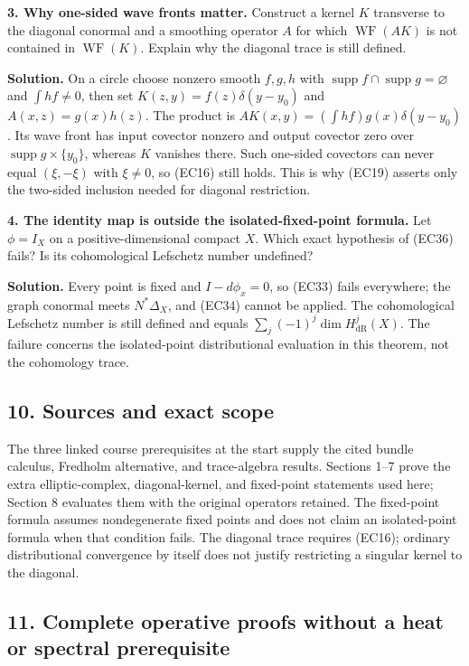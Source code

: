 \documentclass[
  11pt,
]{article}
\begin{document}
\textbf{3. Why one-sided wave fronts matter.} Construct a kernel \(K\)
transverse to the diagonal conormal and a smoothing operator \(A\) for
which \(\operatorname{WF}(AK)\) is not contained in
\(\operatorname{WF}(K)\). Explain why the diagonal trace is still
defined.

\textbf{Solution.} On a circle choose nonzero smooth \(f,g,h\) with
\(\operatorname{supp}f\cap\operatorname{supp}g=\varnothing\) and
\(\int hf\ne0\), then set \(K(z,y)=f(z)\delta(y-y_0)\) and
\(A(x,z)=g(x)h(z)\). The product is
\(AK(x,y)=(\int hf)g(x)\delta(y-y_0)\). Its wave front has input
covector nonzero and output covector zero over
\(\operatorname{supp}g\times\{y_0\}\), whereas \(K\) vanishes there.
Such one-sided covectors can never equal \((\xi,-\xi)\) with
\(\xi\ne0\), so (EC16) still holds. This is why (EC19) asserts only the
two-sided inclusion needed for diagonal restriction.

\textbf{4. The identity map is outside the isolated-fixed-point
formula.} Let \(\phi=I_X\) on a positive-dimensional compact \(X\).
Which exact hypothesis of (EC36) fails? Is its cohomological Lefschetz
number undefined?

\textbf{Solution.} Every point is fixed and \(I-d\phi_x=0\), so (EC33)
fails everywhere; the graph conormal meets \(N^*\Delta_X\), and (EC34)
cannot be applied. The cohomological Lefschetz number is still defined
and equals \(\sum_j(-1)^j\dim H_{\mathrm{dR}}^j(X)\). The failure
concerns the isolated-point distributional evaluation in this theorem,
not the cohomology trace.

\subsection{10. Sources and exact scope}\label{sources-and-exact-scope}

The three linked course prerequisites at the start supply the cited
bundle calculus, Fredholm alternative, and trace-algebra results.
Sections 1--7 prove the extra elliptic-complex, diagonal-kernel, and
fixed-point statements used here; Section 8 evaluates them with the
original operators retained. The fixed-point formula assumes
nondegenerate fixed points and does not claim an isolated-point formula
when that condition fails. The diagonal trace requires (EC16); ordinary
distributional convergence by itself does not justify restricting a
singular kernel to the diagonal.

\subsection{11. Complete operative proofs without a heat or spectral
prerequisite}\label{complete-operative-proofs-without-a-heat-or-spectral-prerequisite}
\end{document}
